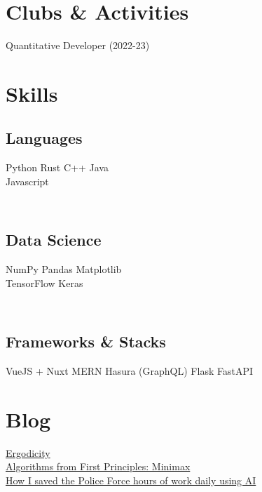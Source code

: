 \documentclass[]{deedy-resume-openfont}
\begin{document}
\begin{minipage}[t]{0.33\textwidth}

\section{Clubs \& Activities} 

\subtitle{NUS Investment Society (QF Dept.)}
\textbullet{} Quantitative Developer (2022-23)
\sectionsep


\section{Skills}
\subsection{Languages}
Python \textbullet{} 
Rust \textbullet{} 
C++ \textbullet{} 
Java \textbullet{}\\ 
Javascript

\subsection{\\Data Science}
NumPy \textbullet{} Pandas \textbullet{} Matplotlib \\
TensorFlow \textbullet{} Keras
\subsection{\\Frameworks \& Stacks}
VueJS + Nuxt \textbullet{} MERN \textbullet{} Hasura (GraphQL) \textbullet{} Flask \textbullet{} FastAPI
\sectionsep


\section{Blog}
\textbullet{} \href{https://medium.com/@g-tejas/ergodicity-f60a3abfcdf8}{Ergodicity} \\
\textbullet{} \href{https://medium.com/becoming-human/algorithms-from-first-principles-minimax-1c57bd6640dc}{Algorithms from First Principles: Minimax} \\
\textbullet{} \href{https://medium.com/becoming-human/how-i-saved-the-police-force-hours-of-work-daily-using-artificial-intelligence-7134e62b982c}{How I saved the Police Force hours of work daily using AI}
\sectionsep

%
%

\end{minipage} 
\end{document}
